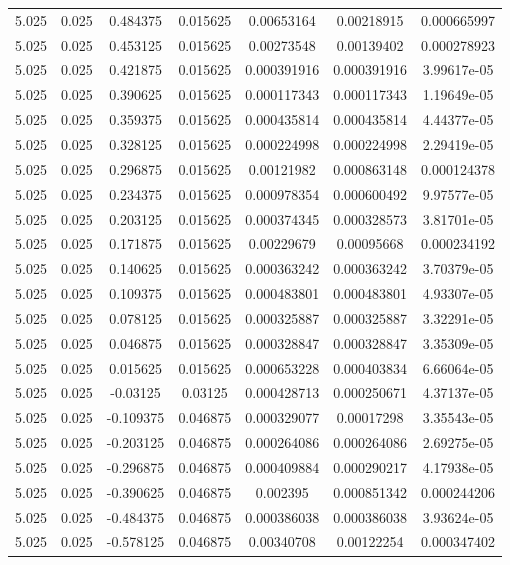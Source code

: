 \begin{flushleft}
\begin{longtable}{ccccccc}
5.025 & 0.025 & 0.484375 & 0.015625 & 0.00653164 & 0.00218915 & 0.000665997  \\ 
5.025 & 0.025 & 0.453125 & 0.015625 & 0.00273548 & 0.00139402 & 0.000278923  \\ 
5.025 & 0.025 & 0.421875 & 0.015625 & 0.000391916 & 0.000391916 & 3.99617e-05  \\ 
5.025 & 0.025 & 0.390625 & 0.015625 & 0.000117343 & 0.000117343 & 1.19649e-05  \\ 
5.025 & 0.025 & 0.359375 & 0.015625 & 0.000435814 & 0.000435814 & 4.44377e-05  \\ 
5.025 & 0.025 & 0.328125 & 0.015625 & 0.000224998 & 0.000224998 & 2.29419e-05  \\ 
5.025 & 0.025 & 0.296875 & 0.015625 & 0.00121982 & 0.000863148 & 0.000124378  \\ 
5.025 & 0.025 & 0.234375 & 0.015625 & 0.000978354 & 0.000600492 & 9.97577e-05  \\ 
5.025 & 0.025 & 0.203125 & 0.015625 & 0.000374345 & 0.000328573 & 3.81701e-05  \\ 
5.025 & 0.025 & 0.171875 & 0.015625 & 0.00229679 & 0.00095668 & 0.000234192  \\ 
5.025 & 0.025 & 0.140625 & 0.015625 & 0.000363242 & 0.000363242 & 3.70379e-05  \\ 
5.025 & 0.025 & 0.109375 & 0.015625 & 0.000483801 & 0.000483801 & 4.93307e-05  \\ 
5.025 & 0.025 & 0.078125 & 0.015625 & 0.000325887 & 0.000325887 & 3.32291e-05  \\ 
5.025 & 0.025 & 0.046875 & 0.015625 & 0.000328847 & 0.000328847 & 3.35309e-05  \\ 
5.025 & 0.025 & 0.015625 & 0.015625 & 0.000653228 & 0.000403834 & 6.66064e-05  \\ 
5.025 & 0.025 & -0.03125 & 0.03125 & 0.000428713 & 0.000250671 & 4.37137e-05  \\ 
5.025 & 0.025 & -0.109375 & 0.046875 & 0.000329077 & 0.00017298 & 3.35543e-05  \\ 
5.025 & 0.025 & -0.203125 & 0.046875 & 0.000264086 & 0.000264086 & 2.69275e-05  \\ 
5.025 & 0.025 & -0.296875 & 0.046875 & 0.000409884 & 0.000290217 & 4.17938e-05  \\ 
5.025 & 0.025 & -0.390625 & 0.046875 & 0.002395 & 0.000851342 & 0.000244206  \\ 
5.025 & 0.025 & -0.484375 & 0.046875 & 0.000386038 & 0.000386038 & 3.93624e-05  \\ 
5.025 & 0.025 & -0.578125 & 0.046875 & 0.00340708 & 0.00122254 & 0.000347402  \\ 

\end{longtable}
\end{flushleft}
